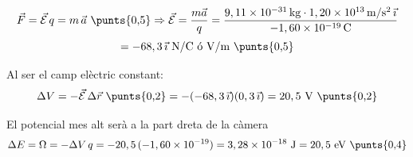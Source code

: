 \begin{solapartat}
\[ \vec{F} = \vec{\mathcal{E}}\,q = m\,\vec{a}\ \text{\punts{0,5}} \Rightarrow \vec{\mathcal{E}} = \frac{m\vec{a}}{q} = \frac{9,11\times 10^{-31}\,\mathrm{kg}\cdot 1,20\times 10^{13}\,\mathrm{m/s^2}\,\vec{\imath}}{-1,60\times 10^{-19}\,\mathrm{C}} \]
\[ = -68,3\,\vec{\imath}\ \mathrm{N/C}\ \text{ó}\ \mathrm{V/m}\ \text{\punts{0,5}} \]
\end{solapartat}

\begin{solapartat}
Al ser el camp elèctric constant:
\[ \Delta V = -\vec{\mathcal{E}}\,\Delta\vec{r}\ \text{\punts{0,2}} = -(-68,3\,\vec{\imath})(0,3\,\vec{\imath}) = 20,5\ \mathrm{V}\ \text{\punts{0,2}} \]

El potencial mes alt serà a la part dreta de la càmera 
\[ \Delta E = \Omega = -\Delta V\,q = -20,5\,(-1,60\times 10^{-19}) = 3,28\times 10^{-18}\ \mathrm{J} = 20,5\ \mathrm{eV}\ \text{\punts{0,4}} \]
\end{solapartat}
